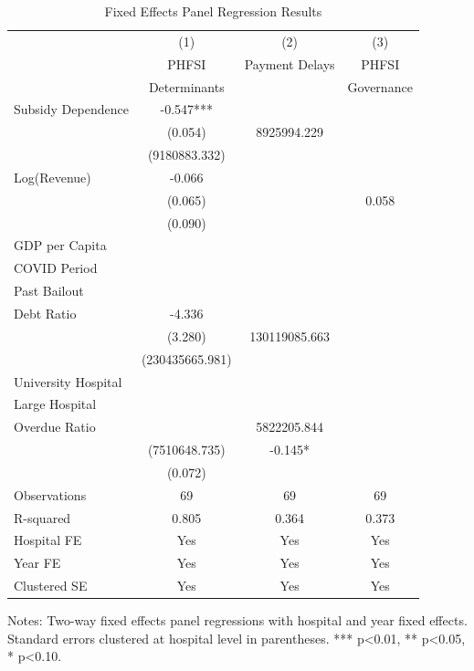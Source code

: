 \begin{table}[htbp]
\centering
\caption{Fixed Effects Panel Regression Results}
\label{tab:panel_regressions}
\begin{tabular}{lccc}
\hline\hline
 & (1) & (2) & (3) \\
 & PHFSI & Payment Delays & PHFSI \\
 & Determinants & & Governance \\
\hline
Subsidy Dependence & -0.547***\\ & (0.054) & 8925994.229\\ & (9180883.332) &  \\
Log(Revenue) & -0.066\\ & (0.065) &  & 0.058\\ & (0.090) \\
GDP per Capita &  &  &  \\
COVID Period &  &  &  \\
Past Bailout &  &  &  \\
Debt Ratio & -4.336\\ & (3.280) & 130119085.663\\ & (230435665.981) &  \\
University Hospital &  &  &  \\
Large Hospital &  &  &  \\
Overdue Ratio &  & 5822205.844\\ & (7510648.735) & -0.145*\\ & (0.072) \\
\hline
Observations & 69 & 69 & 69 \\
R-squared & 0.805 & 0.364 & 0.373 \\
Hospital FE & Yes & Yes & Yes \\
Year FE & Yes & Yes & Yes \\
Clustered SE & Yes & Yes & Yes \\
\hline\hline
\end{tabular}
\begin{tablenotes}
\small
\item Notes: Two-way fixed effects panel regressions with hospital and year fixed effects. 
Standard errors clustered at hospital level in parentheses. 
*** p<0.01, ** p<0.05, * p<0.10.
\end{tablenotes}
\end{table}